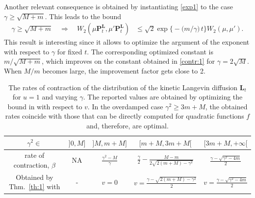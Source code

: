 \documentclass[a4paper,bej,preprint,reqno]{imsart}
\newcommand\bfP{\mathbf P}
\newcommand\bL{\boldsymbol L}
\def\ds{\displaystyle}
\begin{document}
Another relevant consequence is obtained by instantiating \eqref{exp1} to
the case $\gamma \ge \sqrt{M+m}$. This leads to the bound
\begin{align}\label{contr:2}
\gamma \ge \sqrt{M+m}\quad
\Longrightarrow
\quad
W_2(\mu\bfP_t^{\bL},\mu'\bfP_t^{\bL})
	&\le \sqrt{2}\exp\big\{-({{m}/{\gamma})}
	\,t\big\}W_2(\mu,\mu').
\end{align}
This result is interesting since it allows to optimize the argument of the exponent
with respect to $\gamma$ for  fixed $t$. The corresponding optimized constant
is $m/\sqrt{M+m}$, which improves on the constant obtained in \eqref{contr:1} for
$\gamma = 2\sqrt{M}$. When $M/m$ becomes large, the improvement
factor gets close to 2.

\begin{table}[ht]
\begin{tabular}{c|c|c|c|c}
\toprule
$\gamma^2\in$ & $]0,M]$ & $]M, m+M]$ &$[m+M,3m+M[$ & $[3m+M,+\infty[$\\
\midrule
rate of contraction, $\beta$ &  NA & $\ds\frac{\gamma^2-M}{\gamma}$
& $\ds\frac{\gamma}{2} -\frac{M-m}{2\sqrt{2(m+M)-\gamma^2}}$ &
$\ds\frac{\gamma-\sqrt{\gamma^2-4m}}{2}$\\
\midrule
Obtained by Thm.~\ref{th:1}  with & - & $v=0$ & $v= \frac{\gamma-\sqrt{2(m+M)-\gamma^2}}{2}$
& $v=\frac{\gamma-\sqrt{\gamma^2-4m}}{2}$ \\
\bottomrule
\end{tabular}
\caption{The rates of contraction of the distribution of the kinetic Langevin
diffusion $\bL_t$ for $u=1$ and varying $\gamma$. The reported values are obtained by
optimizing the bound in  with respect to $v$. In the overdamped case
$\gamma^2\ge 3m+M$, the obtained rates coincide with those that can be
directly computed for quadratic functions $f$ and, therefore, are optimal.}
\label{tab:1}
\end{table}
\end{document}
